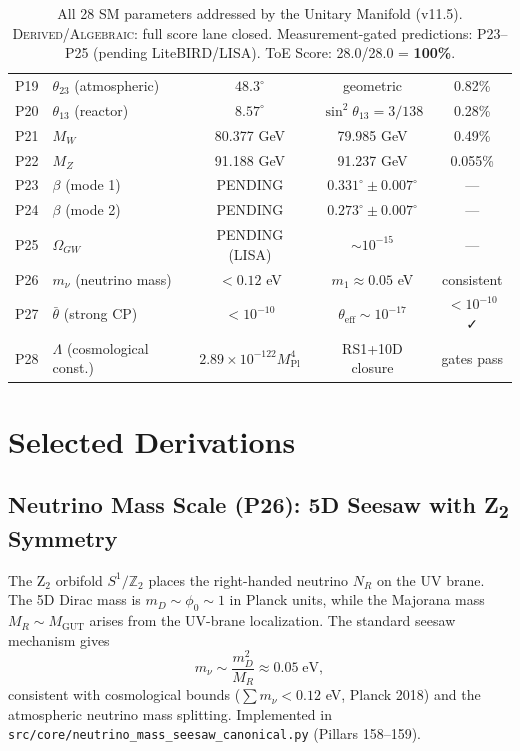 \documentclass[12pt,a4paper]{article}
\begin{document}
\begin{table}[h]
\begin{tabular}{llccc}
P19 & $\theta_{23}$ (atmospheric)     & $48.3^\circ$         & geometric       & 0.82\% \\
P20 & $\theta_{13}$ (reactor)         & $8.57^\circ$         & $\sin^2\theta_{13} = 3/138$ & 0.28\% \\
P21 & $M_W$                           & 80.377 GeV           & 79.985 GeV      & 0.49\% \\
P22 & $M_Z$                           & 91.188 GeV           & 91.237 GeV      & 0.055\% \\
P23 & $\beta$ (mode 1)                & PENDING              & $0.331^\circ \pm 0.007^\circ$ & — \\
P24 & $\beta$ (mode 2)                & PENDING              & $0.273^\circ \pm 0.007^\circ$ & — \\
P25 & $\Omega_{GW}$                   & PENDING (LISA)       & $\sim 10^{-15}$ & — \\
P26 & $m_\nu$ (neutrino mass)         & $< 0.12$ eV          & $m_1 \approx 0.05$ eV & consistent \\
P27 & $\bar\theta$ (strong CP)        & $< 10^{-10}$         & $\theta_\mathrm{eff} \sim 10^{-17}$ & $<10^{-10}$ ✓ \\
P28 & $\Lambda$ (cosmological const.) & $2.89\times10^{-122} M_\mathrm{Pl}^4$ & RS1+10D closure & gates pass \\
\hline
\end{tabular}
\caption{All 28 SM parameters addressed by the Unitary Manifold (v11.5).
  \textsc{Derived}/\textsc{Algebraic}: full score lane closed.
  Measurement-gated predictions: P23--P25 (pending LiteBIRD/LISA).
  ToE Score: 28.0/28.0 = \textbf{100\%}.}
\label{tab:sm-params}
\end{table}

\section{Selected Derivations}
\label{sec:sm-derivations}

\subsection{Neutrino Mass Scale (P26): 5D Seesaw with Z\textsubscript{2} Symmetry}

The Z$_2$ orbifold $S^1/\mathbb{Z}_2$ places the right-handed neutrino $N_R$
on the UV brane.  The 5D Dirac mass is $m_D \sim \phi_0 \sim 1$ in Planck
units, while the Majorana mass $M_R \sim M_\mathrm{GUT}$ arises from the
UV-brane localization.  The standard seesaw mechanism gives
\begin{equation}
  m_\nu \sim \frac{m_D^2}{M_R} \approx 0.05\;\text{eV},
\end{equation}
consistent with cosmological bounds ($\sum m_\nu < 0.12$ eV, Planck 2018)
and the atmospheric neutrino mass splitting.  Implemented in
\texttt{src/core/neutrino\_mass\_seesaw\_canonical.py} (Pillars 158--159).
\end{document}
